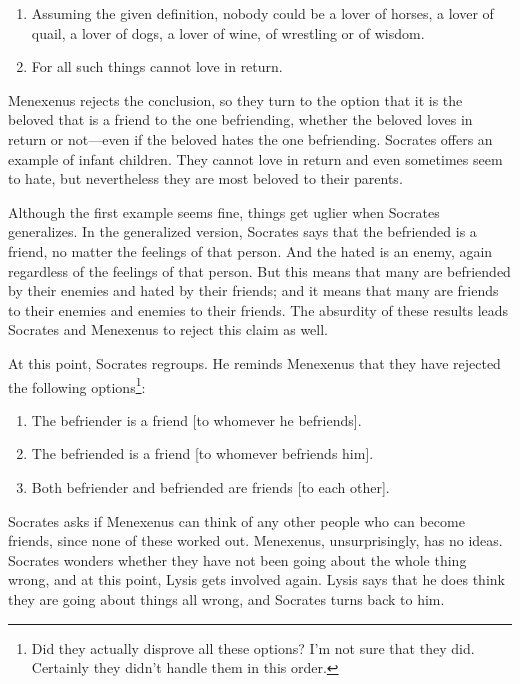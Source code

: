 \documentclass[11pt]{article}
\begin{document}
\begin{enumerate}

    \item Assuming the given definition, nobody could be a lover of horses,
        a lover of quail, a lover of dogs, a lover of wine, of wrestling or
        of wisdom.

    \item For all such things cannot love in return.

\end{enumerate}

Menexenus rejects the conclusion, so they turn to the option that it is the
beloved that is a friend to the one befriending, whether the beloved loves
in return or not---even if the beloved hates the one befriending.  Socrates
offers an example of infant children.  They cannot love in return and even
sometimes seem to hate, but nevertheless they are most beloved to their
parents.

Although the first example seems fine, things get uglier when Socrates
generalizes.  In the generalized version, Socrates says that the befriended
is a friend, no matter the feelings of that person. And the hated is an
enemy, again regardless of the feelings of that person.  But this means
that many are befriended by their enemies and hated by their friends; and
it means that many are friends to their enemies and enemies to their
friends.  The absurdity of these results leads Socrates and Menexenus to
reject this claim as well.

At this point, Socrates regroups.  He reminds Menexenus that they have
rejected the following options\footnote{Did they actually disprove all
these options?  I'm not sure that they did.  Certainly they didn't handle
them in this order.}:

\begin{enumerate}

    \item The befriender is a friend [to whomever he befriends].

    \item The befriended is a friend [to whomever befriends him].

    \item Both befriender and befriended are friends [to each other].

\end{enumerate}

Socrates asks if Menexenus can think of any other people who can become
friends, since none of these worked out.  Menexenus, unsurprisingly, has no
ideas.  Socrates wonders whether they have not been going about the whole
thing wrong, and at this point, Lysis gets involved again.  Lysis says that
he does think they are going about things all wrong, and Socrates turns
back to him.
\end{document}
